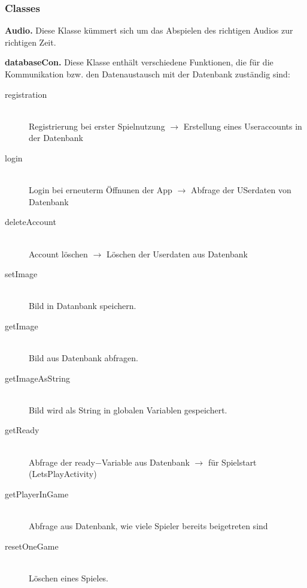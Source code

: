 \documentclass[12pt, a4paper]{article}
\begin{document}
  
		\subsubsection{Classes}		
		
\hspace{0,6 cm}\textbf{Audio.}
Diese Klasse kümmert sich um das Abspielen des richtigen Audios zur richtigen Zeit.

\vspace{0,3 cm}

\textbf{databaseCon.}
Diese Klasse enthält verschiedene Funktionen, die für die Kommunikation bzw. den Datenaustausch mit der Datenbank zuständig sind:

\begin{description}

\item[registration]\hfill \\
Registrierung bei erster Spielnutzung $\rightarrow$ Erstellung eines Useraccounts in der Datenbank

\item[login]\hfill \\
Login bei erneuterm Öffnunen der App $\rightarrow$ Abfrage der USerdaten von Datenbank

\item[deleteAccount]\hfill \\
Account löschen $\rightarrow$ Löschen der Userdaten aus Datenbank

\item[setImage]\hfill \\
Bild in Datanbank speichern.

\item[getImage]\hfill \\
Bild aus Datenbank abfragen.

\item[getImageAsString]\hfill \\
Bild wird als String in globalen Variablen gespeichert.

\item[getReady]\hfill \\
Abfrage der ready$-$Variable aus Datenbank $\rightarrow$ für Spielstart (LetsPlayActivity)

\item[getPlayerInGame]\hfill \\
Abfrage aus Datenbank, wie viele Spieler bereits beigetreten sind 

\item[resetOneGame]\hfill \\
Löschen eines Spieles.


\end{description}
\end{document}
